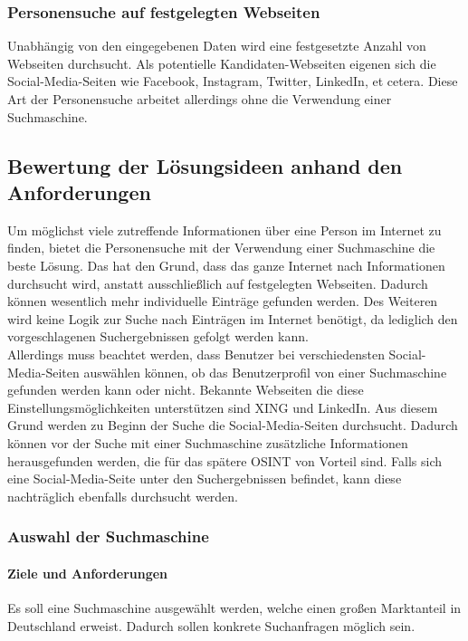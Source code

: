 		\subsubsection{Personensuche auf festgelegten Webseiten}
		\label{subsubsec:PersonensucheohneSuchmaschine}
		Unabhängig von den eingegebenen Daten wird eine festgesetzte Anzahl von Webseiten durchsucht. Als potentielle Kandidaten-Webseiten eigenen sich die Social-Media-Seiten wie Facebook, Instagram, Twitter, LinkedIn, et cetera. Diese Art der Personensuche arbeitet allerdings ohne die Verwendung einer Suchmaschine.
		
		\subsection{Bewertung der Lösungsideen anhand den Anforderungen}
		Um möglichst viele zutreffende Informationen über eine Person im Internet zu finden, bietet die Personensuche mit der Verwendung einer Suchmaschine die beste Lösung. Das hat den Grund, dass das ganze Internet nach Informationen durchsucht wird, anstatt ausschließlich auf festgelegten Webseiten. Dadurch können wesentlich mehr individuelle Einträge gefunden werden. Des Weiteren wird keine Logik zur Suche nach Einträgen im Internet benötigt, da lediglich den vorgeschlagenen Suchergebnissen gefolgt werden kann.\\
		Allerdings muss beachtet werden, dass Benutzer bei verschiedensten Social-Media-Seiten auswählen können, ob das Benutzerprofil von einer Suchmaschine gefunden werden kann oder nicht. Bekannte Webseiten die diese Einstellungsmöglichkeiten unterstützen sind XING und LinkedIn. Aus diesem Grund werden zu Beginn der Suche die Social-Media-Seiten durchsucht. Dadurch können vor der Suche mit einer Suchmaschine zusätzliche Informationen herausgefunden werden, die für das spätere OSINT von Vorteil sind. Falls sich eine Social-Media-Seite unter den Suchergebnissen befindet, kann diese nachträglich ebenfalls durchsucht werden.
		
			\subsubsection{Auswahl der Suchmaschine}
				\paragraph{Ziele und Anforderungen}
				Es soll eine Suchmaschine ausgewählt werden, welche einen großen Marktanteil in Deutschland erweist. Dadurch sollen konkrete Suchanfragen möglich sein. 
